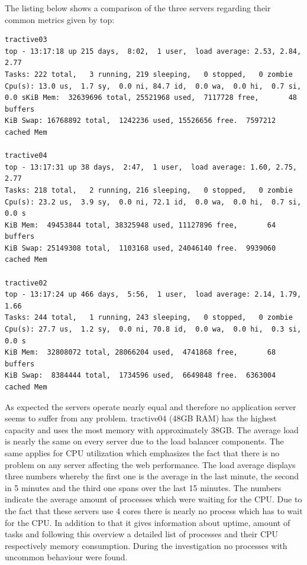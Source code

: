 The listing below shows a comparison of the three servers regarding their common metrics given by top:
\begin{lstlisting}[caption=Output from top command on Tractive Hosts]
tractive03
top - 13:17:18 up 215 days,  8:02,  1 user,  load average: 2.53, 2.84, 2.77
Tasks: 222 total,   3 running, 219 sleeping,   0 stopped,   0 zombie
Cpu(s): 13.0 us,  1.7 sy,  0.0 ni, 84.7 id,  0.0 wa,  0.0 hi,  0.7 si,  0.0 sKiB Mem:  32639696 total, 25521968 used,  7117728 free,       48 buffers
KiB Swap: 16768892 total,  1242236 used, 15526656 free.  7597212 cached Mem

tractive04
top - 13:17:31 up 38 days,  2:47,  1 user,  load average: 1.60, 2.75, 2.77
Tasks: 218 total,   2 running, 216 sleeping,   0 stopped,   0 zombie
Cpu(s): 23.2 us,  3.9 sy,  0.0 ni, 72.1 id,  0.0 wa,  0.0 hi,  0.7 si,  0.0 s
KiB Mem:  49453844 total, 38325948 used, 11127896 free,       64 buffers
KiB Swap: 25149308 total,  1103168 used, 24046140 free.  9939060 cached Mem

tractive02
top - 13:17:24 up 466 days,  5:56,  1 user,  load average: 2.14, 1.79, 1.66
Tasks: 244 total,   1 running, 243 sleeping,   0 stopped,   0 zombie
Cpu(s): 27.7 us,  1.2 sy,  0.0 ni, 70.8 id,  0.0 wa,  0.0 hi,  0.3 si,  0.0 s
KiB Mem:  32808072 total, 28066204 used,  4741868 free,       68 buffers
KiB Swap:  8384444 total,  1734596 used,  6649848 free.  6363004 cached Mem
\end{lstlisting}
As expected the servers operate nearly equal and therefore no application server seems to suffer from any problem. tractive04 (48GB RAM) has the highest capacity and uses the most memory with approximately 38GB. The average load is nearly the same on every server due to the load balancer components. The same applies for CPU utilization which emphasizes the fact that there is no problem on any server affecting the web performance. The load average displays three numbers whereby the first one is the average in the last minute, the second in 5 minutes and the third one spans over the last 15 minutes. The numbers indicate the average amount of processes which were waiting for the CPU. Due to the fact that these servers use 4 cores there is nearly no process which has to wait for the CPU. In addition to that it gives information about uptime, amount of tasks and following this overview a detailed list of processes and their CPU respectively memory consumption. During the investigation no processes with uncommon behaviour were found.
